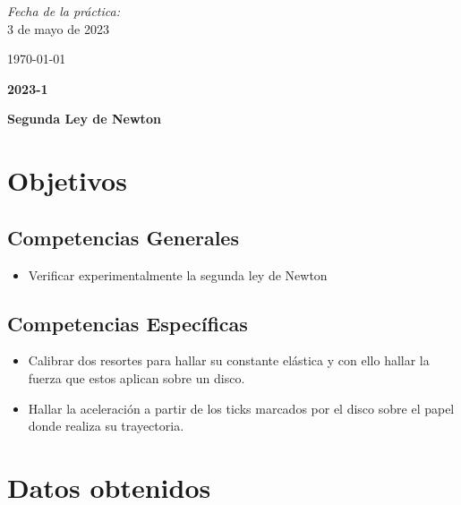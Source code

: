 \documentclass[10pt]{article}
\begin{document}
\begin{center}
\vspace{-2.7cm}	
\begin{flushright}	
\large
\emph{Fecha de la práctica:}\\
\vspace{0.1cm}
3 de mayo de 2023
\end{flushright}
 \vspace{2.4cm}

\large{\today}\\
\vspace{0.3cm}

{ \Large\bfseries 2023-1}
										 			
\end{center}							 											
																					
\newpage																		

\tableofcontents 

\newpage

\begin{center}
    \textbf{\huge Segunda Ley de Newton}
\end{center}

\section{Objetivos}
\subsection{Competencias Generales}
\begin{itemize}
    \item Verificar experimentalmente la segunda ley de Newton
\end{itemize} 
\subsection{Competencias Específicas}
\begin{itemize}
    \item Calibrar dos resortes para hallar su constante elástica y con ello hallar la fuerza que estos aplican sobre un disco.
    \item Hallar la aceleración a partir de los ticks marcados por el disco sobre el papel donde realiza su trayectoria.
\end{itemize}

\section{Datos obtenidos}
\end{document}
